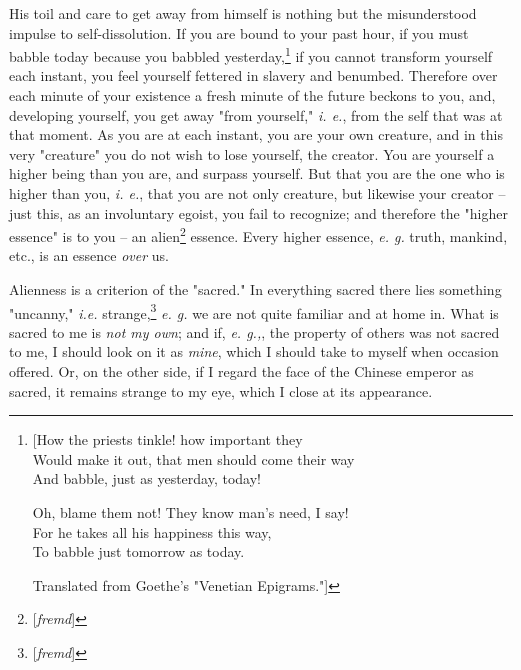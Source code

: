 \documentclass[a4paper]{book}
\begin{document}
His toil and care to get away from himself is nothing but the misunderstood 
impulse to self-dissolution. If you are bound to your past hour, if you must 
babble today because you babbled yesterday,\footnote{[How the priests tinkle! 
how important they\\
 Would make it out, that men should come their way\\
 And babble, just as yesterday, today!

Oh, blame them not! They know man's need, I say!\\
 For he takes all his happiness this way,\\
 To babble just tomorrow as today.

Translated from Goethe's "{}Venetian Epigrams."{}]

} if you cannot transform yourself each instant, you feel yourself fettered in 
slavery and benumbed. Therefore over each minute of your existence a fresh 
minute of the future beckons to you, and, developing yourself, you get away 
"{}from yourself,"{} \textit{i. e.}, from the self that was at that moment. As 
you are at each instant, you are your own creature, and in this very 
"{}creature"{} you do not wish to lose yourself, the creator. You are yourself 
a higher being than you are, and surpass yourself. But that you are the one 
who is higher than you, \textit{i. e.}, that you are not only creature, but 
likewise your creator -- just this, as an involuntary egoist, you fail to 
recognize; and therefore the "{}higher essence"{} is to you -- an 
alien\footnote{[\textit{fremd}]} essence. Every higher essence, \textit{e. g.} 
truth, mankind, etc., is an essence \textit{over} us.

Alienness is a criterion of the "{}sacred."{} In everything sacred there lies 
something "{}uncanny,"{} \textit{i.e.} strange,\footnote{[\textit{fremd}]} 
\textit{e. g.} we are not quite familiar and at home in. What is sacred to me 
is \textit{not my own}; and if, \textit{e. g.,}, the property of others was 
not sacred to me, I should look on it as \textit{mine}, which I should take to 
myself when occasion offered. Or, on the other side, if I regard the face of 
the Chinese emperor as sacred, it remains strange to my eye, which I close at 
its appearance.
\end{document}
